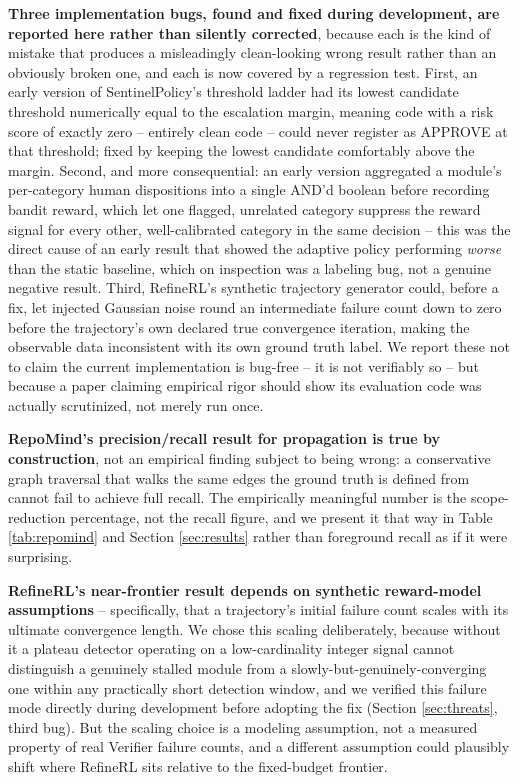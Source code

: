 \documentclass[conference]{IEEEtran}
\begin{document}
\textbf{Three implementation bugs, found and fixed during development, are
reported here rather than silently corrected}, because each is the kind of
mistake that produces a misleadingly clean-looking wrong result rather than
an obviously broken one, and each is now covered by a regression test.
First, an early version of SentinelPolicy's threshold ladder had its lowest
candidate threshold numerically equal to the escalation margin, meaning
code with a risk score of exactly zero -- entirely clean code -- could never
register as APPROVE at that threshold; fixed by keeping the lowest candidate
comfortably above the margin. Second, and more consequential: an early
version aggregated a module's per-category human dispositions into a single
AND'd boolean before recording bandit reward, which let one flagged,
unrelated category suppress the reward signal for every other, well-calibrated
category in the same decision -- this was the direct cause of an early result
that showed the adaptive policy performing \emph{worse} than the static
baseline, which on inspection was a labeling bug, not a genuine negative
result. Third, RefineRL's synthetic trajectory generator could, before a
fix, let injected Gaussian noise round an intermediate failure count down to
zero before the trajectory's own declared true convergence iteration,
making the observable data inconsistent with its own ground truth label.
We report these not to claim the current implementation is bug-free -- it
is not verifiably so -- but because a paper claiming empirical rigor should
show its evaluation code was actually scrutinized, not merely run once.

\textbf{RepoMind's precision/recall result for propagation is true by
construction}, not an empirical finding subject to being wrong: a
conservative graph traversal that walks the same edges the ground truth is
defined from cannot fail to achieve full recall. The empirically meaningful
number is the scope-reduction percentage, not the recall figure, and we
present it that way in Table \ref{tab:repomind} and Section
\ref{sec:results} rather than foreground recall as if it were surprising.

\textbf{RefineRL's near-frontier result depends on synthetic reward-model
assumptions} -- specifically, that a trajectory's initial failure count
scales with its ultimate convergence length. We chose this scaling
deliberately, because without it a plateau detector operating on a
low-cardinality integer signal cannot distinguish a genuinely stalled module
from a slowly-but-genuinely-converging one within any practically short
detection window, and we verified this failure mode directly during
development before adopting the fix (Section \ref{sec:threats}, third bug).
But the scaling choice is a modeling assumption, not a measured property of
real Verifier failure counts, and a different assumption could plausibly
shift where RefineRL sits relative to the fixed-budget frontier.
\end{document}
